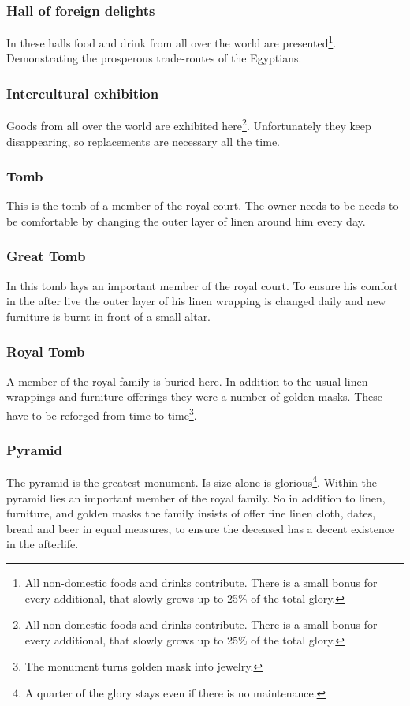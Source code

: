 \documentclass[a4paper]{book}
\begin{document}
		\subsubsection{Hall of foreign delights}
			In these halls food and drink from all over the world are presented\footnote{
				All non-domestic foods and drinks contribute.
				There is a small bonus for every additional,
				that slowly grows up to 25\% of the total glory.
			}.
			Demonstrating the prosperous trade-routes of the \gls{Egyptians}.

		\subsubsection{Intercultural exhibition}
			Goods from all over the world are exhibited here\footnote{
				All non-domestic foods and drinks contribute.
				There is a small bonus for every additional,
				that slowly grows up to 25\% of the total glory.
			}.
			Unfortunately they keep disappearing, so replacements are necessary
			all the time.

		\subsubsection{Tomb}
			This is the tomb of a member of the royal court.
			The owner needs to be needs to be comfortable by changing
			the outer layer of linen around him every day.

		\subsubsection{Great Tomb}
			In this tomb lays an important member of the royal court.
			To ensure his comfort in the after live the outer layer
			of his linen wrapping is changed daily and new furniture
			is burnt in front of a small altar.

		\subsubsection{Royal Tomb}
			A member of the royal family is buried here.
			In addition to the usual linen wrappings and furniture offerings
			they were a number of golden masks.
			These have to be reforged from time to time\footnote{
				The monument turns golden mask into jewelry.
			}.

		\subsubsection{Pyramid}
			The pyramid is the greatest monument.
			Is size alone is glorious\footnote{
				A quarter of the glory stays even if there is no maintenance.
			}.
			Within the pyramid lies an important member of the royal family.
			So in addition to linen, furniture, and golden masks
			the family insists of offer fine linen cloth, dates, bread and beer
			in equal measures, to ensure the deceased has a decent  existence
			in the afterlife.
\end{document}

